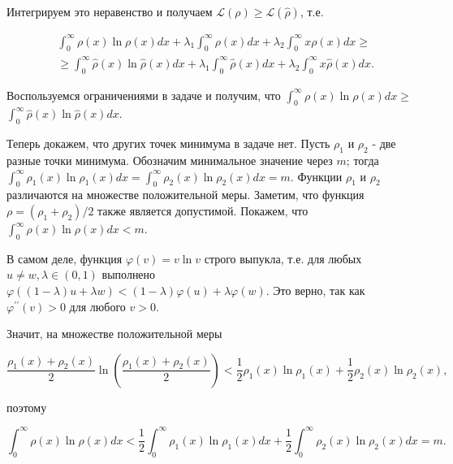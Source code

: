 \begin{task}
Интегрируем это неравенство и получаем $\mathcal{L}(\rho) \geq \mathcal{L}(\hat{\rho})$, т.е.

$$
\begin{aligned}
	& \int_{0}^{\infty} \rho(x) \ln \rho(x) d x+\lambda_{1} \int_{0}^{\infty} \rho(x) d x+\lambda_{2} \int_{0}^{\infty} x \rho(x) d x \geq \\
	& \geq \int_{0}^{\infty} \hat{\rho}(x) \ln \hat{\rho}(x) d x+\lambda_{1} \int_{0}^{\infty} \hat{\rho}(x) d x+\lambda_{2} \int_{0}^{\infty} x \hat{\rho}(x) d x .
\end{aligned}
$$

Воспользуемся ограничениями в задаче и получим, что $\int_{0}^{\infty} \rho(x) \ln \rho(x) d x \geq$ $\int_{0}^{\infty} \hat{\rho}(x) \ln \hat{\rho}(x) d x$.

Теперь докажем, что других точек минимума в задаче нет. Пусть $\rho_{1}$ и $\rho_{2}$ - две разные точки минимума. Обозначим минимальное значение через $m$; тогда $\int_{0}^{\infty} \rho_{1}(x) \ln \rho_{1}(x) d x=\int_{0}^{\infty} \rho_{2}(x) \ln \rho_{2}(x) d x=m$. Функции $\rho_{1}$ и $\rho_{2}$ различаются на множестве положительной меры. Заметим, что функция $\rho=\left(\rho_{1}+\rho_{2}\right) / 2$ также является допустимой. Покажем, что $\int_{0}^{\infty} \rho(x) \ln \rho(x) d x<m$.

В самом деле, функция $\varphi(v)=v \ln v$ строго выпукла, т.е. для любых $u \neq w, \lambda \in(0,1)$ выполнено $\varphi((1-\lambda) u+\lambda w)<(1-\lambda) \varphi(u)+\lambda \varphi(w)$. Это верно, так как $\varphi^{\prime \prime}(v)>0$ для любого $v>0$.

Значит, на множестве положительной меры

$$
\frac{\rho_{1}(x)+\rho_{2}(x)}{2} \ln \left(\frac{\rho_{1}(x)+\rho_{2}(x)}{2}\right)<\frac{1}{2} \rho_{1}(x) \ln \rho_{1}(x)+\frac{1}{2} \rho_{2}(x) \ln \rho_{2}(x),
$$

поэтому

$$
\int_{0}^{\infty} \rho(x) \ln \rho(x) d x<\frac{1}{2} \int_{0}^{\infty} \rho_{1}(x) \ln \rho_{1}(x) d x+\frac{1}{2} \int_{0}^{\infty} \rho_{2}(x) \ln \rho_{2}(x) d x=m .
$$
\end{task}